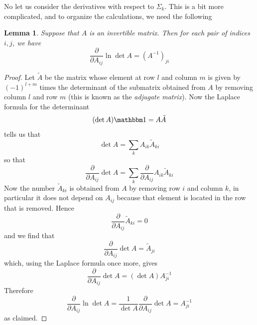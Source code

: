 \documentclass[a4paper, draft]{article}
\theoremstyle{own}
\newtheorem{lem}[thm]{Lemma}
\theoremstyle{remark}
\begin{document}
No let us consider the derivatives with respect to $\Sigma_k$. This is a bit more complicated, and to organize the calculations, we need the following 

\begin{lem}
Suppose that $A$ is an invertible matrix. Then for each pair of indices $i,j$, we have
$$
\frac{\partial }{\partial A_{ij}} \ln \det A = (A^{-1})_{ji}
$$
\end{lem}

\begin{proof}
Let $\tilde{A}$ be the matrix whose element at row $l$ and column $m$ is given by 
$(-1)^{l+m}$ times the determinant of the submatrix obtained from $A$ by removing column $l$ and row $m$ (this is known as the {\em adjugate matrix}). 
Now the Laplace formula for the determinant
$$
(\det A) {\mathbbm 1} = A \tilde{A}
$$
tells us that
$$
\det A = \sum_k A_{ik} \tilde{A}_{ki}
$$
so that
$$
\frac{\partial }{\partial A_{ij}} \det A = 
\sum_k \frac{\partial }{\partial A_{ij}} A_{ik} \tilde{A}_{ki}
$$
Now the number $\tilde{A}_{ki}$ is obtained from $A$ by removing row $i$ and column $k$, in particular it does not depend on $A_{ij}$ because that element is located in the row that is removed. Hence
$$
\frac{\partial }{\partial A_{ij}} \tilde{A}_{ki} = 0
$$
and we find that
$$
\frac{\partial }{\partial A_{ij}} \det A  = \tilde{A}_{ji}
$$
which, using the Laplace formula once more, gives
$$
\frac{\partial }{\partial A_{ij}} \det A = (\det A) A^{-1}_{ji}
$$
Therefore
$$
\frac{\partial }{\partial A_{ij}} \ln \det A = \frac{1}{\det A} \frac{\partial }{\partial A_{ij}} \det A = A^{-1}_{ji}
$$
as claimed.
\end{proof}
\end{document}
